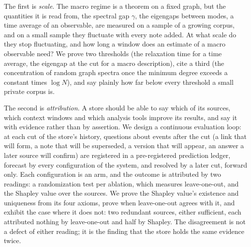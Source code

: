 \documentclass[11pt,a4paper]{article}
\theoremstyle{plain}
\theoremstyle{definition}
\theoremstyle{remark}
\begin{document}
The first is \emph{scale}. The macro regime is a theorem on a fixed graph, but the quantities it is
read from, the spectral gap $\gamma$, the eigengaps between modes, a time average of an observable,
are measured on a sample of a growing corpus, and on a small sample they fluctuate with every note
added. At what scale do they stop fluctuating, and how long a window does an estimate of a macro
observable need? We prove two thresholds (the relaxation time for a time average, the eigengap at
the cut for a macro description), cite a third (the concentration of random graph spectra once the
minimum degree exceeds a constant times $\log N$), and say plainly how far below every threshold a
small private corpus is.

The second is \emph{attribution}. A store should be able to say which of its sources, which
context windows and which analysis tools improve its results, and say it with evidence rather than
by assertion. We design a continuous evaluation loop: at each cut of the store's history, questions
about events after the cut (a link that will form, a note that will be superseded, a version that
will appear, an answer a later source will confirm) are registered in a pre-registered prediction
ledger, forecast by every configuration of the system, and resolved by a later cut, forward only.
Each configuration is an arm, and the outcome is attributed by two readings: a randomization test
per ablation, which measures leave-one-out, and the Shapley value over the sources. We prove the
Shapley value's existence and uniqueness from its four axioms, prove when leave-one-out agrees with
it, and exhibit the case where it does not: two redundant sources, either sufficient, each
attributed nothing by leave-one-out and half by Shapley. The disagreement is not a defect of either
reading; it is the finding that the store holds the same evidence twice.
\end{document}
